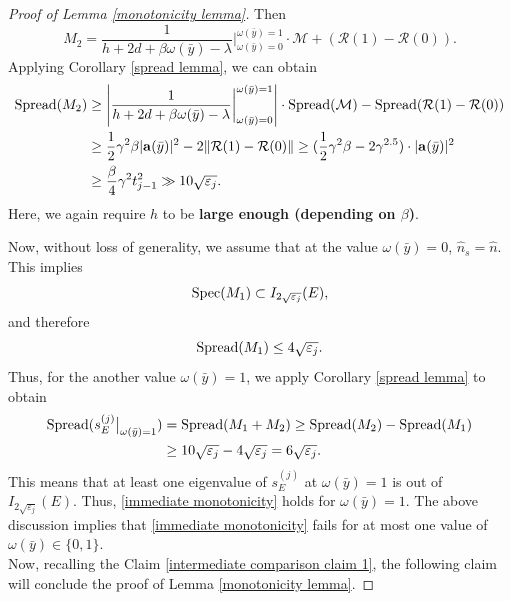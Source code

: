 \documentclass[11pt,reqno,UTF8,twoside]{amsart}
\newcommand{\spec}{{\rm Spec}}
\newcommand{\bfa}{\mathbf{a}}
\newcommand{\spread}{{\rm Spread}}
\newcommand{\mcR}{\mathcal{R}}
\newcommand{\mcM}{\mathcal{M}}
\newcommand{\whn}{\widehat{n}}
\newcommand{\smallSj}{s^{(j)}}
\theoremstyle{definition}
\numberwithin{equation}{section}
\begin{document}
\begin{proof}[Proof of Lemma \ref{monotonicity lemma}]
Then 
\[M_2= \frac{1}{h+2d+\beta\omega(\bar{y})-\lambda} \bigg|_{\omega(\bar{y})=0}^{\omega(\bar{y})=1} \cdot \mcM + (\mcR(1)-\mcR(0)). \]
Applying Corollary \ref{spread lemma}, we can obtain 
\begin{align}\label{beta dependence of height 2}
\notag  \spread(M_2)& \geq \left|  \frac{1}{h+2d+\beta\omega(\bar{y})-\lambda} \bigg|_{\omega(\bar{y})=0}^{\omega(\bar{y})=1}  \right|\cdot \spread(\mcM)-\spread(\mcR(1)-\mcR(0)) \\
   \notag & \geq \frac{1}{2}\gamma^2 \beta |\bfa(\bar{y})|^2- 2\| \mcR(1)-\mcR(0)\| \geq (\frac{1}{2}\gamma^2 \beta -2\gamma^{2.5})\cdot |\bfa(\bar{y})|^2  \\
      &\geq   \frac{\beta}{4}\gamma^2 t^2_{j-1} \gg 10\sqrt{\varepsilon_{j}}.
\end{align}
Here, we again require  $h$  to be  \textbf{{large enough (depending on $\beta$)}}.


Now, without loss of generality, we assume that at the value $\omega(\bar{y})=0$, $\whn_s=\whn$. This implies 
\[\spec(M_1)\subset I_{2\sqrt{\varepsilon_j}}(E),\]
and therefore 
\[\spread(M_1)\leq 4 \sqrt{\varepsilon_j}.\]
Thus, for the another value $\omega(\bar{y})=1$, we apply Corollary \ref{spread lemma} to obtain 
\begin{align*}
  \spread(\smallSj_E \big|_{\omega(\bar{y})=1}) & =\spread(M_1+M_2) \geq \spread(M_2)-\spread(M_1) \\
   &\geq 10 \sqrt{\varepsilon_j}-4\sqrt{\varepsilon_j} = 6\sqrt{\varepsilon_j}.
\end{align*} 
This means that at least one eigenvalue of $\smallSj_E$ at $\omega(\bar{y})=1$ is out of $I_{2\sqrt{\varepsilon_j}}(E)$. Thus, \eqref{immediate monotonicity} holds for $\omega(\bar{y})=1$. The above discussion implies that  \eqref{immediate monotonicity} fails for at most one value of $\omega(\bar{y})\in \{0,1\}$.\\


Now, recalling  the Claim \ref{intermediate comparison claim 1}, the following claim will conclude  the proof of Lemma \ref{monotonicity lemma}.


\end{proof}
\end{document}
